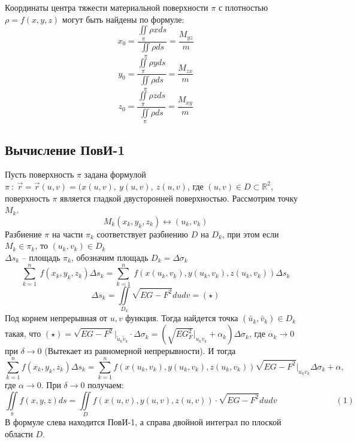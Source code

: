 \documentclass[../../main.tex]{subfiles}
\begin{document}
	Координаты центра тяжести материальной поверхности $\pi$ с плотностью $\rho =
	 f(x,y,z)$ могут быть найдены по формуле: 
	\[x_0 = \frac{\iint \limits_\pi \rho  x ds}{\iint \limits_\pi \rho ds} =
	 \frac{M_{yz}}{m}\]
	\[y_0 = \frac{\iint \limits_\pi \rho  y ds}{\iint \limits_\pi \rho ds} =
	 \frac{M_{zx}}{m}\]
	\[z_0 = \frac{\iint \limits_\pi \rho  z ds}{\iint \limits_\pi \rho ds} =
	 \frac{M_{xy}}{m}\]
    	\subsection{Вычисление ПовИ-1}
	Пусть поверхность $\pi$ задана формулой $\pi \ : \ \overrightarrow{r} =
	 \overrightarrow{r}(u, v) = (x(u,v), \ y(u,v), \ z(u, v)$, где $(u, v) \in D
	  \subset \mathds{R}^2$, поверхность $\pi$ является гладкой двусторонней
	   поверхностью. Рассмотрим точку $M_k$.
	\[M_k(x_k, y_k, z_k) \leftrightarrow (u_k, v_k)\]
	Разбиение $\pi$ на части $\pi_k$ соответствует разбиению $D$ на $D_k$, при этом
	 если $M_k \in \pi_k$, то $(u_k, v_k) \in D_k$\\
	$\Delta s_k$ \--- площадь $\pi_k$, обозначим площадь $D_k  = \Delta\sigma _k$\\
	\[\sum^{n}_{k=1} \ f(x_k, y_k, z_k)\Delta s_k = \sum^{n}_{k=1} \ f(x(u_k, v_k),
	 y(u_k, v_k), z(u_k, v_k))\Delta s_k \]
	\[\Delta s_k = \iint \limits_{D_k}\sqrt{EG - F^2}dudv = (\star)  \]
	Под корнем непрерывная от $u, v$ функция. Тогда найдется точка $(\tilde{u_k},
	 \tilde{v_k}) \in D_k$ такая, что $(\star) = \sqrt{EG -F^2} \big|_{\tilde{u}_k
	  \tilde{v}_k} \cdot \Delta \sigma_k = (\sqrt{EG _F^2} \big|_{u_kv_k} +\alpha_k)
   \Delta \sigma_k$, где $\alpha_k \to 0$ при $\delta \to 0$ (Вытекает из равномерной
    непрерывности). И тогда 
	\[ \sum_{k=1}^{n} f(x_k,y_k, z_k) \Delta s_k = \sum_{k=1}^{n} f(x(u_k, v_k),
	 y(u_k, v_k), z(u_k, v_k)) \sqrt{EG - F^2}\big|_{u_k v_k} \Delta \sigma_k
	  +\alpha,\]
	где $\alpha \to 0$. При $\delta \to 0$ получаем:
	\[ \iint \limits_{\pi} f(x,y,z)ds = \iint \limits_Df(x(u,v), y(u,v),z(u,v)) 
	\cdot \sqrt{EG - F^2} du dv \qquad \qquad \qquad \quad (1) \]
    В формуле слева находится ПовИ-1, а справа двойной интеграл по плоской области
     $D$.\\
\end{document}
